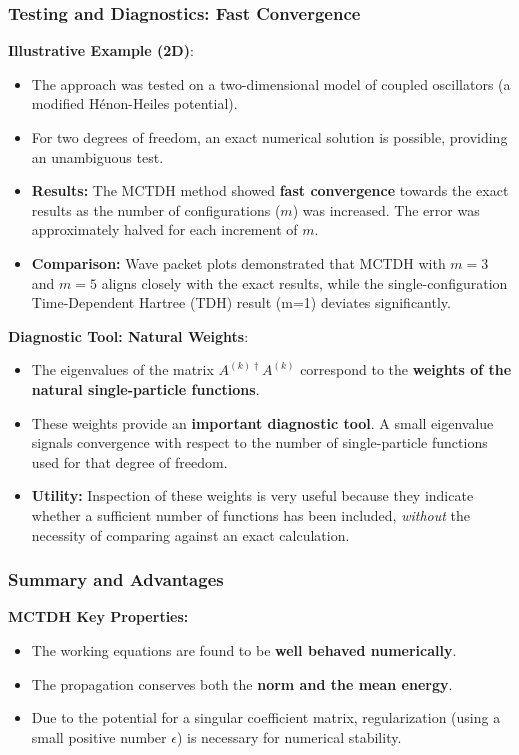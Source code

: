\begin{frame}
    \frametitle{Testing and Diagnostics: Fast Convergence}
    
    \textbf{Illustrative Example (2D)}:
    \begin{itemize}
        \item The approach was tested on a two-dimensional model of coupled oscillators (a modified Hénon-Heiles potential).
        \item For two degrees of freedom, an exact numerical solution is possible, providing an unambiguous test.
        \item \textbf{Results:} The MCTDH method showed \textbf{fast convergence} towards the exact results as the number of configurations ($m$) was increased. The error was approximately halved for each increment of $m$.
        \item \textbf{Comparison:} Wave packet plots demonstrated that MCTDH with $m=3$ and $m=5$ aligns closely with the exact results, while the single-configuration Time-Dependent Hartree (TDH) result (m=1) deviates significantly.
    \end{itemize}
    \end{frame}
    \begin{frame}
    \textbf{Diagnostic Tool: Natural Weights}:
    \begin{itemize}
        \item The eigenvalues of the matrix $A^{(k)\dagger}A^{(k)}$ correspond to the \textbf{weights of the natural single-particle functions}.
        \item These weights provide an \textbf{important diagnostic tool}. A small eigenvalue signals convergence with respect to the number of single-particle functions used for that degree of freedom.
        \item \textbf{Utility:} Inspection of these weights is very useful because they indicate whether a sufficient number of functions has been included, \textit{without} the necessity of comparing against an exact calculation.
    \end{itemize}
\end{frame}

\begin{frame}
    \frametitle{Summary and Advantages}
    
    \textbf{MCTDH Key Properties:}
    \begin{itemize}
        \item The working equations are found to be \textbf{well behaved numerically}.
        \item The propagation conserves both the \textbf{norm and the mean energy}.
        \item Due to the potential for a singular coefficient matrix, regularization (using a small positive number $\epsilon$) is necessary for numerical stability.
    \end{itemize}
\end{frame}

